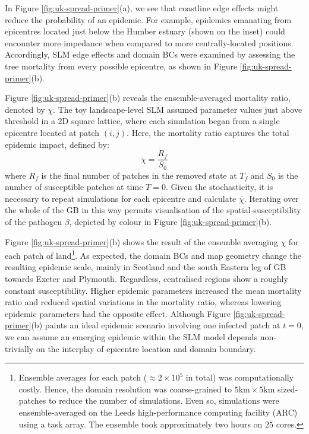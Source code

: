 In Figure \ref{fig:uk-spread-primer}(a), we see that coastline edge effects
might reduce the probability of an epidemic.
For example, epidemics emanating from epicentres located just below the 
Humber estuary (shown on the inset) could encounter more impedance when 
compared to more centrally-located positions.
Accordingly, SLM edge effects and domain BCs were examined by assessing the 
tree mortality from every possible epicentre, as shown in Figure \ref{fig:uk-spread-primer}(b).

Figure \ref{fig:uk-spread-primer}(b) reveals the ensemble-averaged mortality 
ratio, denoted by $\chi$.
The toy landscape-level SLM assumed parameter values just above threshold in a 2D square lattice,
where each simulation began from a single epicentre located at patch $(i, j)$.
Here, the mortality ratio captures the total epidemic impact, defined by: 
\begin{equation}
\label{eq:epi_impact}
    \chi=\frac{R_f}{S_0}
\end{equation}
where $R_f$ is the final number of patches in the removed state at $T_f$ and $S_0$ is the number of susceptible 
patches at time $T=0$.
Given the stochasticity, it is necessary to repeat simulations for each epicentre 
and calculate $\overline{\chi}$. Iterating over the whole of the GB in this way permits visualisation
of the spatial-susceptibility of the pathogen $\beta$, depicted by colour in Figure \ref{fig:uk-spread-primer}(b).

Figure \ref{fig:uk-spread-primer}(b) shows the result of the ensemble averaging $\chi$ for each
patch of land\footnote{Ensemble averages for each patch ($\approx 2 \times 10^5$ in total) was computationally costly. 
Hence, the domain resolution was coarse-grained to $\mathrm{5km \times 5km}$ sized-patches to reduce the number of simulations.
Even so, simulations were ensemble-averaged on the Leeds high-performance computing facility (ARC) using a task array.
The ensemble took approximately two hours on $25$ cores.}.
As expected, the domain BCs and map geometry change the resulting epidemic scale, 
mainly in Scotland and the south Eastern leg of GB towards Exeter and Plymouth.
Regardless, centralised regions show a roughly constant susceptibility. 
Higher epidemic parameters increased the mean mortality ratio and reduced spatial variations in the mortality ratio, whereas lowering epidemic parameters had the opposite effect.
Although Figure \ref{fig:uk-spread-primer}(b) paints an ideal epidemic scenario involving one infected patch at $t=0$,
we can assume an emerging epidemic within the SLM model depends non-trivially on the interplay of epicentre location and domain boundary.
 
